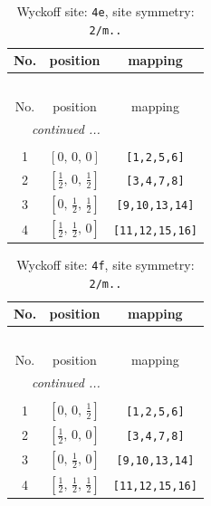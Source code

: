 \documentclass[fleqn,8pt]{jsarticle}
\begin{document}
\renewcommand{\arraystretch}{1.2}
\begin{longtable}{ccc}
\caption{Wyckoff site: {\tt 4e}, site symmetry: {\tt 2/m..}}
 \\
 \hline \hline
No. & position & mapping \\ \hline \endfirsthead

\multicolumn{2}{l}{\tablename\ \thetable{}} \\
 \hline \hline
No. & position & mapping \\ \hline \endhead

 \hline \hline
\multicolumn{2}{r}{\footnotesize\it continued ...} \\ \endfoot

 \hline \hline
\multicolumn{2}{r}{} \\ \endlastfoot

1 & $\left[ 0,\, 0,\, 0 \right]$ & {\tt [1,2,5,6]} \\ \hline
2 & $\left[ \frac{1}{2},\, 0,\, \frac{1}{2} \right]$ & {\tt [3,4,7,8]} \\ \hline
3 & $\left[ 0,\, \frac{1}{2},\, \frac{1}{2} \right]$ & {\tt [9,10,13,14]} \\ \hline
4 & $\left[ \frac{1}{2},\, \frac{1}{2},\, 0 \right]$ & {\tt [11,12,15,16]} \\
\end{longtable}
\renewcommand{\arraystretch}{1.2}
\begin{longtable}{ccc}
\caption{Wyckoff site: {\tt 4f}, site symmetry: {\tt 2/m..}}
 \\
 \hline \hline
No. & position & mapping \\ \hline \endfirsthead

\multicolumn{2}{l}{\tablename\ \thetable{}} \\
 \hline \hline
No. & position & mapping \\ \hline \endhead

 \hline \hline
\multicolumn{2}{r}{\footnotesize\it continued ...} \\ \endfoot

 \hline \hline
\multicolumn{2}{r}{} \\ \endlastfoot

1 & $\left[ 0,\, 0,\, \frac{1}{2} \right]$ & {\tt [1,2,5,6]} \\ \hline
2 & $\left[ \frac{1}{2},\, 0,\, 0 \right]$ & {\tt [3,4,7,8]} \\ \hline
3 & $\left[ 0,\, \frac{1}{2},\, 0 \right]$ & {\tt [9,10,13,14]} \\ \hline
4 & $\left[ \frac{1}{2},\, \frac{1}{2},\, \frac{1}{2} \right]$ & {\tt [11,12,15,16]} \\
\end{longtable}
\end{document}
